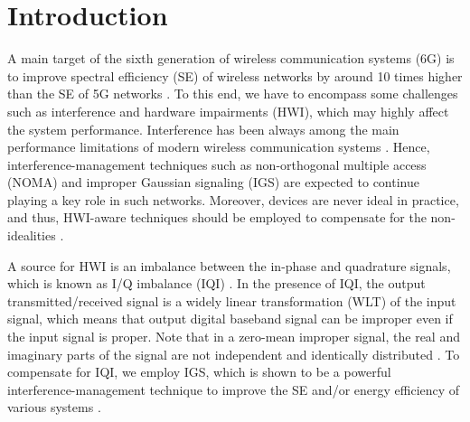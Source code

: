 \documentclass[a4, conference]{IEEEtran}
\theoremstyle{definition}
\begin{document}
\section{Introduction}
A main target of the sixth generation of wireless communication systems (6G) is to improve spectral efficiency (SE) of wireless networks by around 10 times higher than the SE of 5G networks \cite{gong2022holographic}. To this end, we have to encompass some challenges such as interference and hardware impairments (HWI), which may highly affect the system performance. Interference has been always among the main performance limitations of modern wireless communication systems \cite{andrews2014will}. Hence, interference-management techniques such as non-orthogonal multiple access (NOMA) and improper Gaussian signaling (IGS) are expected to continue playing a key role in such networks. Moreover, devices are never ideal in practice, and thus, HWI-aware techniques should be employed to compensate for the non-idealities \cite{soleymani2020rate, soleymani2020improper, soleymani2023rate, javed2019multiple, soleymani2019improper}.

A source for HWI is an imbalance between the in-phase and quadrature signals, which is known as I/Q imbalance (IQI) \cite{soleymani2020improper, javed2019multiple}. In the presence of IQI, the output  transmitted/received signal is a widely linear transformation (WLT) of the input signal, which means that output digital baseband signal can be improper even if the input signal is proper. Note that in a zero-mean improper signal, the real and imaginary parts of the signal are not independent and identically distributed \cite{adali2011complex}. To compensate for IQI, we employ IGS, which is shown to be a powerful interference-management technique to improve the SE and/or energy efficiency of various systems 
\cite{cadambe2010interference, soleymani2019ergodic, soleymani2020improper,  soleymani2019energy, javed2020journey}.
\end{document}
